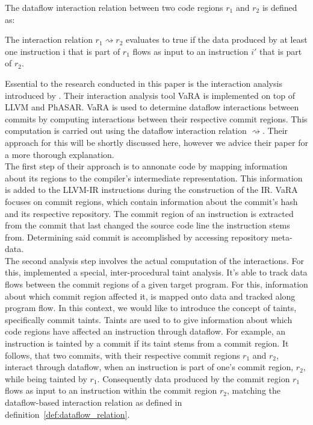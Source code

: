 The dataflow interaction relation between two code regions $r_1$ and $r_2$ is defined as:

\begin{definition}\label{def:dataflow_relation}
	The interaction relation $r_1 \rightsquigarrow r_2$ evaluates to true if the data produced by at least one instruction i that is part of $r_1$
	flows as input to an instruction $i'$ that is part of $r_2$.
\end{definition}

Essential to the research conducted in this paper is the interaction analysis introduced by \citet{sattler2023thesis}.
Their interaction analysis tool VaRA is implemented on top of LLVM and PhASAR.
VaRA is used to determine dataflow interactions between commits by computing interactions between their respective commit regions.
This computation is carried out using the dataflow interaction relation $\rightsquigarrow$.
Their approach for this will be shortly discussed here, however we advice their paper for a more thorough explanation. \\
The first step of their approach is to annonate code by mapping information about its regions to the compiler's intermediate representation.
This information is added to the LLVM-IR instructions during the construction of the IR.
VaRA focuses on commit regions, which contain information about the commit's hash and its respective repository.
The commit region of an instruction is extracted from the commit that last changed the source code line the instruction stems from.
Determining said commit is accomplished by accessing repository meta-data. \\
The second analysis step involves the actual computation of the interactions.
For this, \citet{sattler2023thesis} implemented a special, inter-procedural taint analysis.
It's able to track data flows between the commit regions of a given target program.
For this, information about which commit region affected it, is mapped onto data and tracked along program flow.
In this context, we would like to introduce the concept of taints, specifically commit taints.
Taints are used to to give information about which code regions have affected an instruction through dataflow.
For example, an instruction is tainted by a commit if its taint stems from a commit region.
It follows, that two commits, with their respective commit regions $r_1$ and $r_2$, interact through dataflow, when an instruction is part of one's commit region, $r_2$, while being tainted by $r_1$.
Consequently data produced by the commit region $r_1$ flows as input to an instruction within the commit region $r_2$, matching the dataflow-based interaction relation as defined in definition~\ref{def:dataflow_relation}.

